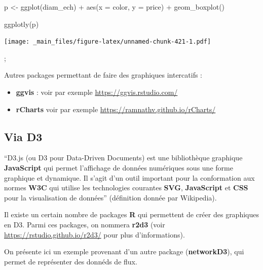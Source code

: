 \documentclass[
]{book}
\newenvironment{Shaded}{\begin{snugshade}}{\end{snugshade}}
\newcommand{\AttributeTok}[1]{\textcolor[rgb]{0.77,0.63,0.00}{#1}}
\newcommand{\FunctionTok}[1]{\textcolor[rgb]{0.00,0.00,0.00}{#1}}
\newcommand{\NormalTok}[1]{#1}
\newcommand{\OtherTok}[1]{\textcolor[rgb]{0.56,0.35,0.01}{#1}}
\newcommand{\SpecialCharTok}[1]{\textcolor[rgb]{0.00,0.00,0.00}{#1}}
\theoremstyle{definition}
\theoremstyle{definition}
\theoremstyle{definition}
\theoremstyle{definition}
\theoremstyle{remark}
\begin{document}
\begin{Shaded}
\begin{Highlighting}[]
\NormalTok{p }\OtherTok{\textless{}{-}} \FunctionTok{ggplot}\NormalTok{(diam\_ech) }\SpecialCharTok{+}              
  \FunctionTok{aes}\NormalTok{(}\AttributeTok{x =}\NormalTok{ color, }\AttributeTok{y =}\NormalTok{ price) }\SpecialCharTok{+}  
  \FunctionTok{geom\_boxplot}\NormalTok{() }
\end{Highlighting}
\end{Shaded}

\begin{Shaded}
\begin{Highlighting}[]
\FunctionTok{ggplotly}\NormalTok{(p)}
\end{Highlighting}
\end{Shaded}

\texttt{[image: \_main\_files/figure-latex/unnamed-chunk-421-1.pdf]}

;

Autres packages permettant de faire des graphiques intercatifs :

\begin{itemize}
\item
  \textbf{ggvis} : voir par exemple \url{https://ggvis.rstudio.com/}
\item
  \textbf{rCharts} voir par exemple \url{https://ramnathv.github.io/rCharts/}
\end{itemize}

\hypertarget{via-d3}{%
\subsection{\texorpdfstring{Via \textbf{D3}}{Via D3}}\label{via-d3}}

``D3.js (ou D3 pour Data-Driven Documents) est une bibliothèque graphique \textbf{JavaScript} qui permet l'affichage de données numériques sous une forme graphique et dynamique. Il s'agit d'un outil important pour la conformation aux normes \textbf{W3C} qui utilise les technologies courantes \textbf{SVG}, \textbf{JavaScript} et \textbf{CSS} pour la visualisation de données'' (définition donnée par Wikipedia).

Il existe un certain nombre de packages \textbf{R} qui permettent de créer des graphiques en D3. Parmi ces packages, on nommera \textbf{r2d3} (voir \url{https://rstudio.github.io/r2d3/} pour plus d'informations).

On présente ici un exemple provenant d'un autre package (\textbf{networkD3}), qui permet de représenter des donnéds de flux.
\end{document}
